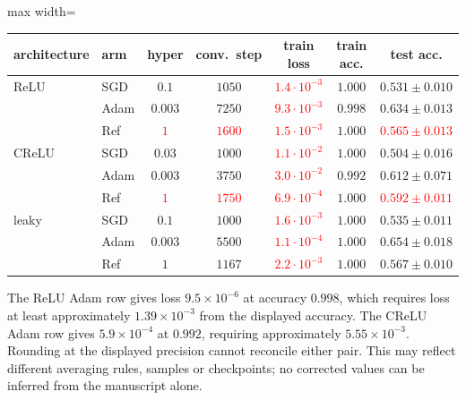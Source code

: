 \documentclass{article}
\newcommand{\nat}[1]{\textcolor{red}{#1}}
\theoremstyle{definition}
\theoremstyle{remark}
\begin{document}
\begin{center}\small
\begin{adjustbox}{max width=\linewidth}
\begin{tabular}{llccccc}
\toprule
architecture & arm & hyper & conv.\ step & train loss & train acc. & test acc. \\
\midrule
ReLU   & SGD & $0.1$    & $1050$ & \nat{$1.4\cdot10^{-3}$} & $1.000$ & $0.531 \pm 0.010$ \\
       & Adam             & $0.003$  & $7250$ & \nat{$9.3\cdot10^{-3}$} & $0.998$ & $\mathbf{0.634 \pm 0.013}$ \\
       & Ref        & \nat{$1$}    & \nat{$1600$}  & \nat{$1.5\cdot10^{-3}$} & $1.000$ & \nat{$0.565 \pm 0.013$} \\
\midrule
CReLU  & SGD & $0.03$   & $1000$ & \nat{$1.1\cdot10^{-2}$} & $1.000$ & $0.504 \pm 0.016$ \\
       & Adam             & $0.003$  & $3750$ & \nat{$3.0\cdot10^{-2}$} & $0.992$ & $\mathbf{0.612 \pm 0.071}$ \\
       & Ref        & \nat{$1$}     & \nat{$1750$} & \nat{$6.9\cdot10^{-4}$} & $1.000$ & \nat{$0.592 \pm 0.011$} \\
\midrule
leaky  & SGD & $0.1$    & $1000$ & \nat{$1.6\cdot10^{-3}$} & $1.000$ & $0.535 \pm 0.011$ \\
       & Adam             & $0.003$  & $5500$ & \nat{$1.1\cdot10^{-4}$} & $1.000$ & $\mathbf{0.654 \pm 0.018}$ \\
       & Ref        & $1$      & $1167$ & \nat{$2.2\cdot10^{-3}$} & $1.000$ & $0.567 \pm 0.010$ \\
\bottomrule
\end{tabular}
\end{adjustbox}
\end{center}

The ReLU Adam row gives loss $9.5\times10^{-6}$ at accuracy $0.998$, which requires loss at least approximately $1.39\times10^{-3}$ from the displayed accuracy. The CReLU Adam row gives $5.9\times10^{-4}$ at $0.992$, requiring approximately $5.55\times10^{-3}$. Rounding at the displayed precision cannot reconcile either pair. This may reflect different averaging rules, samples or checkpoints; no corrected values can be inferred from the manuscript alone.
\end{document}

